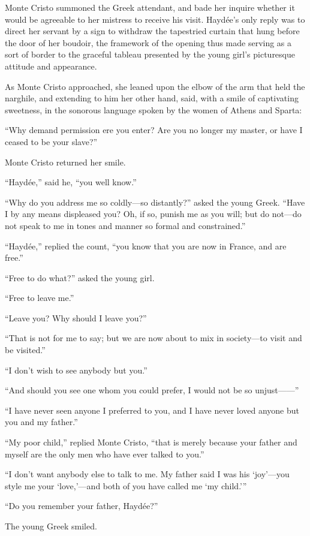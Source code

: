 Monte Cristo summoned the Greek attendant, and bade her inquire whether
it would be agreeable to her mistress to receive his visit. Haydée’s
only reply was to direct her servant by a sign to withdraw the
tapestried curtain that hung before the door of her boudoir, the
framework of the opening thus made serving as a sort of border to the
graceful tableau presented by the young girl’s picturesque attitude and
appearance.

As Monte Cristo approached, she leaned upon the elbow of the arm that
held the narghile, and extending to him her other hand, said, with a
smile of captivating sweetness, in the sonorous language spoken by the
women of Athens and Sparta:

“Why demand permission ere you enter? Are you no longer my master, or
have I ceased to be your slave?”

Monte Cristo returned her smile.

“Haydée,” said he, “you well know.”

“Why do you address me so coldly—so distantly?” asked the young Greek.
“Have I by any means displeased you? Oh, if so, punish me as you will;
but do not—do not speak to me in tones and manner so formal and
constrained.”

“Haydée,” replied the count, “you know that you are now in France, and
are free.”

“Free to do what?” asked the young girl.

“Free to leave me.”

“Leave you? Why should I leave you?”

“That is not for me to say; but we are now about to mix in society—to
visit and be visited.”

“I don’t wish to see anybody but you.”

“And should you see one whom you could prefer, I would not be so
unjust——”

“I have never seen anyone I preferred to you, and I have never loved
anyone but you and my father.”

“My poor child,” replied Monte Cristo, “that is merely because your
father and myself are the only men who have ever talked to you.”

“I don’t want anybody else to talk to me. My father said I was his
‘joy’—you style me your ‘love,’—and both of you have called me ‘my
child.’”

“Do you remember your father, Haydée?”

The young Greek smiled.

